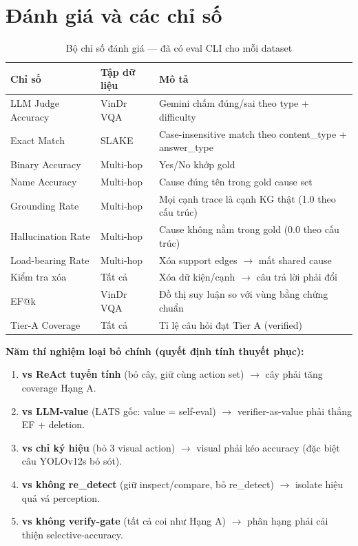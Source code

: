 \documentclass[11pt,a4paper]{article}
\begin{document}
\section{Đánh giá và các chỉ số}

\begin{table}[H]
\centering\small
\begin{tabular}{l l p{6.5cm}}
\toprule
\textbf{Chỉ số} & \textbf{Tập dữ liệu} & \textbf{Mô tả} \\
\midrule
LLM Judge Accuracy & VinDr VQA & Gemini chấm đúng/sai theo type + difficulty \\
Exact Match & SLAKE & Case-insensitive match theo content\_type + answer\_type \\
Binary Accuracy & Multi-hop & Yes/No khớp gold \\
Name Accuracy & Multi-hop & Cause đúng tên trong gold cause set \\
Grounding Rate & Multi-hop & Mọi cạnh trace là cạnh KG thật (1.0 theo cấu trúc) \\
Hallucination Rate & Multi-hop & Cause không nằm trong gold (0.0 theo cấu trúc) \\
Load-bearing Rate & Multi-hop & Xóa support edges $\to$ mất shared cause \\
Kiểm tra xóa & Tất cả & Xóa dữ kiện/cạnh $\to$ câu trả lời phải đổi \\
EF@k & VinDr VQA & Đồ thị suy luận so với vùng bằng chứng chuẩn \\
Tier-A Coverage & Tất cả & Tỉ lệ câu hỏi đạt Tier A (verified) \\
\bottomrule
\end{tabular}
\caption{Bộ chỉ số đánh giá --- đã có eval CLI cho mỗi dataset}
\end{table}

\textbf{Năm thí nghiệm loại bỏ chính (quyết định tính thuyết phục):}
\begin{enumerate}[leftmargin=1.5em]
  \item \textbf{vs ReAct tuyến tính} (bỏ cây, giữ cùng action set) $\to$ cây phải tăng coverage Hạng A.
  \item \textbf{vs LLM-value} (LATS gốc: value = self-eval) $\to$ verifier-as-value phải thắng EF + deletion.
  \item \textbf{vs chỉ ký hiệu} (bỏ 3 visual action) $\to$ visual phải kéo accuracy (đặc biệt câu YOLOv12s bỏ sót).
  \item \textbf{vs không re\_detect} (giữ inspect/compare, bỏ re\_detect) $\to$ isolate hiệu quả vá perception.
  \item \textbf{vs không verify-gate} (tất cả coi như Hạng A) $\to$ phân hạng phải cải thiện selective-accuracy.
\end{enumerate}
\end{document}
